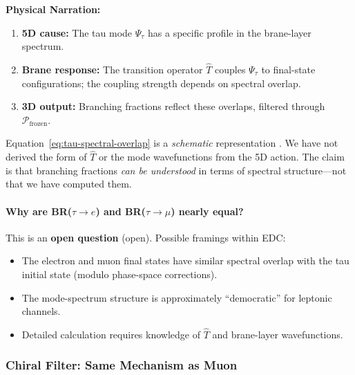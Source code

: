 \textbf{Physical Narration:}
\begin{enumerate}[nosep]
    \item \textbf{5D cause:} The tau mode $\Psi_\tau$ has a specific profile
          in the brane-layer spectrum.
    \item \textbf{Brane response:} The transition operator $\hat{T}$ couples
          $\Psi_\tau$ to final-state configurations; the coupling strength
          depends on spectral overlap.
    \item \textbf{3D output:} Branching fractions reflect these overlaps,
          filtered through $\mathcal{P}_{\mathrm{frozen}}$.
\end{enumerate}

\begin{tcolorbox}[edcWarning, title=\textbf{Non-Overclaim Reminder}]
Equation~\eqref{eq:tau-spectral-overlap} is a \emph{schematic} representation
\tagP{}. We have not derived the form of $\hat{T}$ or the mode
wavefunctions from the 5D action. The claim is that branching fractions
\emph{can be understood} in terms of spectral structure—not that we have
computed them.
\end{tcolorbox}

\paragraph{\texorpdfstring{Why are BR($\tau \to e$) and BR($\tau \to \mu$) nearly equal?}{Why are BR(tau to e) and BR(tau to mu) nearly equal?}}
This is an \textbf{open question} (open). Possible framings within EDC:
\begin{itemize}[nosep]
    \item The electron and muon final states have similar spectral overlap
          with the tau initial state (modulo phase-space corrections).
    \item The mode-spectrum structure is approximately ``democratic'' for
          leptonic channels.
    \item Detailed calculation requires knowledge of $\hat{T}$ and brane-layer
          wavefunctions.
\end{itemize}


\subsubsection{Chiral Filter: Same Mechanism as Muon}

